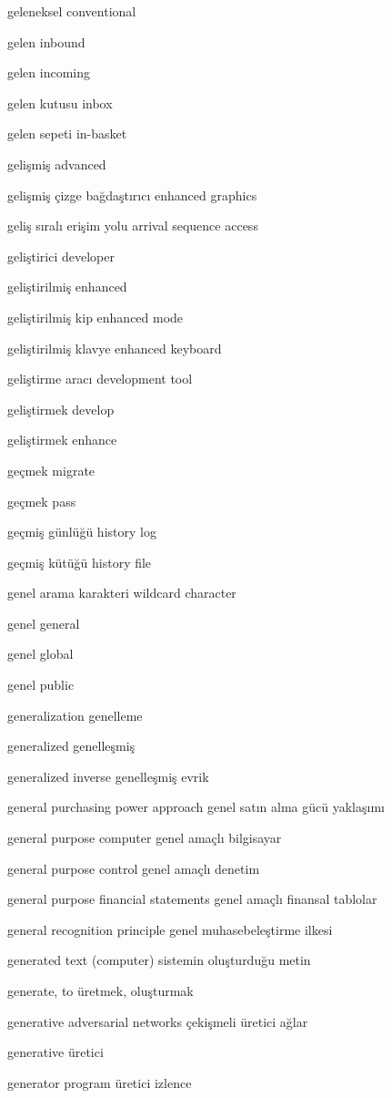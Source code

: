 \documentclass[12pt,fleqn]{article}\usepackage{../../common}
\begin{document}
geleneksel conventional

gelen inbound

gelen incoming

gelen kutusu inbox

gelen sepeti in-basket

gelişmiş advanced

gelişmiş çizge bağdaştırıcı enhanced graphics

geliş sıralı erişim yolu arrival sequence access

geliştirici developer

geliştirilmiş enhanced

geliştirilmiş kip enhanced mode

geliştirilmiş klavye enhanced keyboard

geliştirme aracı development tool

geliştirmek develop

geliştirmek enhance

geçmek migrate

geçmek pass

geçmiş günlüğü history log

geçmiş kütüğü history file

genel arama karakteri wildcard character

genel general

genel global

genel public

generalization genelleme

generalized genelleşmiş

generalized inverse genelleşmiş evrik

general purchasing power approach genel satın alma gücü yaklaşımı

general purpose computer genel amaçlı bilgisayar

general purpose control genel amaçlı denetim

general purpose financial statements genel amaçlı finansal tablolar

general recognition principle genel muhasebeleştirme ilkesi

generated text (computer) sistemin oluşturduğu metin

generate, to üretmek, oluşturmak

generative adversarial networks çekişmeli üretici ağlar

generative üretici

generator program üretici izlence
\end{document}
